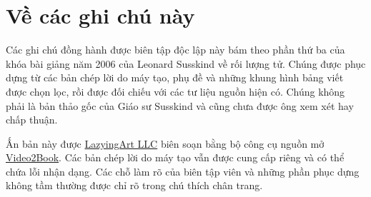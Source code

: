 \documentclass[11pt,oneside]{book}
\begin{document}
\frontmatter
\hypersetup{pageanchor=false}

\hypersetup{pageanchor=true}

\clearpage
\chapter*{Về các ghi chú này}
Các ghi chú đồng hành được biên tập độc lập này bám theo phần thứ ba của khóa bài giảng năm 2006 của Leonard Susskind về rối lượng tử. Chúng được phục dựng từ các bản chép lời do máy tạo, phụ đề và những khung hình bảng viết được chọn lọc, rồi được đối chiếu với các tư liệu nguồn hiện có. Chúng không phải là bản thảo gốc của Giáo sư Susskind và cũng chưa được ông xem xét hay chấp thuận.

Ấn bản này được \href{https://lazying.art}{LazyingArt LLC} biên soạn bằng bộ công cụ nguồn mở \href{https://github.com/lachlanchen/Video2Book}{Video2Book}. Các bản chép lời do máy tạo vẫn được cung cấp riêng và có thể chứa lỗi nhận dạng. Các chỗ làm rõ của biên tập viên và những phần phục dựng không tầm thường được chỉ rõ trong chú thích chân trang.
\clearpage
\tableofcontents
\mainmatter








\end{document}
